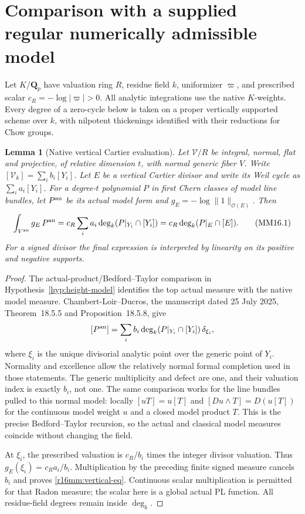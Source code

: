 \documentclass[11pt,a4paper]{article}
\newtheorem{lemma}[theorem]{Lemma}
\theoremstyle{definition}
\theoremstyle{remark}
\numberwithin{equation}{section}
\begin{document}
\section{Comparison with a supplied regular numerically admissible model}
\label{r16mm:section}

Let $K/\mathbf Q_p$ have valuation ring $R$, residue field $k$,
uniformizer $\varpi$, and prescribed scalar
$c_R=-\log|\varpi|>0$. All analytic integrations use the native
$K$-weights. Every degree of a zero-cycle below is taken on a
proper vertically supported scheme over $k$, with nilpotent
thickenings identified with their reductions for Chow groups.

\begin{lemma}[Native vertical Cartier evaluation]
\label{r16mm:vertical}
Let $\mathcal V/R$ be integral, normal, flat and projective,
of relative dimension $t$, with normal generic fiber $V$.
Write $[\mathcal V_k]=\sum_i b_i[Y_i]$. Let $E$ be a vertical
Cartier divisor and write its Weil cycle as $\sum_i a_i[Y_i]$.
For a degree-$t$ polynomial $P$ in first Chern classes of model
line bundles, let $P^{\rm an}$ be its actual model form and
$g_E=-\log\|1\|_{\mathcal O(E)}$. Then
\[
 \int_{V^{\rm an}}g_E\,P^{\rm an}
     =c_R\sum_i a_i\deg_k(P|_{Y_i}\cap[Y_i])
     =c_R\deg_k(P|_E\cap[E]).
 \tag{MM16.1}\label{r16mm:vertical-eq}
\]
For a signed divisor the final expression is interpreted by
linearity on its positive and negative supports.
\end{lemma}

\begin{proof}
The actual-product/Bedford--Taylor comparison in
Hypothesis~\ref{hyp:height-model} identifies the top actual measure with
the native model measure. Chambert-Loir--Ducros, the manuscript
dated 25 July 2025, Theorem~18.5.5 and Proposition~18.5.8, give
\[
 [P^{\rm an}]=\sum_i b_i\deg_k(P|_{Y_i}\cap[Y_i])\,\delta_{\xi_i},
\]
where $\xi_i$ is the unique divisorial analytic point over the
generic point of $Y_i$. Normality and excellence allow the
relatively normal formal completion used in those statements.
The generic multiplicity and defect are one, and their valuation
index is exactly $b_i$, not one. The same comparison works
for the line bundles pulled to this normal model: locally
$[uT]=u[T]$ and $[Du\wedge T]=D(u[T])$ for the continuous model
weight $u$ and a closed model product $T$. This is the precise
Bedford--Taylor recursion, so the actual and classical model
measures coincide without changing the field.

At $\xi_i$, the prescribed valuation is $c_R/b_i$ times the
integer divisor valuation. Thus $g_E(\xi_i)=c_Ra_i/b_i$.
Multiplication by the preceding finite signed measure cancels
$b_i$ and proves \eqref{r16mm:vertical-eq}. Continuous scalar
multiplication is permitted for that Radon measure; the scalar
here is a global actual PL function. All residue-field degrees
remain inside $\deg_k$.
\end{proof}
\end{document}
